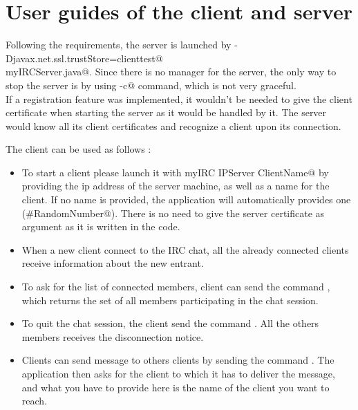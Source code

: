 \documentclass{article}
\begin{document}
\section{User guides of the client and server}
Following the requirements, the server is launched by \verb@java -Djavax.net.ssl.trustStore=clienttest@\\\verb@trust myIRCServer.java@. Since there is no manager for the server, the only way to stop the server is by using \verb@ctrl-c@ command, which is not very graceful.\\
If a registration feature was implemented, it wouldn't be needed to give the client certificate when starting the server as it would be handled by it. The server would know all its client certificates and recognize a client upon its connection.

The client can be used as follows : 
\begin{itemize}
\item To start a client please launch it with \verb@java myIRC IPServer ClientName@ by providing the ip address of the server machine, as well as a name for the client. If no name is provided, the application will automatically provides one (\verb@guest#RandomNumber@). There is no need to give the server certificate as argument as it is written in the code.
\item When a new client connect to the IRC chat, all the already connected clients receive information about the new entrant.
\item To ask for the list of connected members, client can send the command \verb@who@, which returns the set of all members participating in the chat session.
\item To quit the chat session, the client send the command \verb@quit@. All the others members receives the disconnection notice.
\item Clients can send message to others clients by sending the command \verb@msg@. The application then asks for the client to which it has to deliver the message, and what you have to provide here is the name of the client you want to reach.
\end{itemize}
\end{document}
